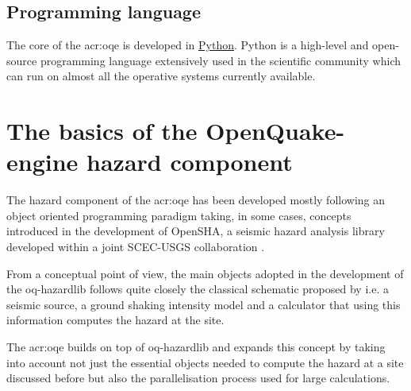 \subsection{Programming language}
The core of the \gls{acr:oqe} is developed in 
\href{https://www.python.org/}{Python}. Python is a high-level and open-source
programming language extensively used in the scientific community 
which can run on almost all the operative systems currently available.
%
%
\section{The basics of the OpenQuake-engine hazard component}
%
The hazard component of the \gls{acr:oqe} has been developed mostly following 
an object oriented programming paradigm taking, in some cases,  
concepts introduced in the development of OpenSHA, a seismic hazard 
analysis library developed within a joint SCEC-USGS collaboration 
\parencite{field2003}. 

From a conceptual point of view, the main objects adopted in the development
of the oq-hazardlib follows quite closely the classical schematic proposed by
\textcite{reiter1991} i.e. a seismic source, a ground shaking intensity model 
and a calculator that using this information computes the hazard at the site.

The \gls{acr:oqe} builds on top of oq-hazardlib and expands this 
concept by taking into account not just the essential objects 
needed to compute the hazard at a site discussed before but 
also the parallelisation process used for large calculations.
%
